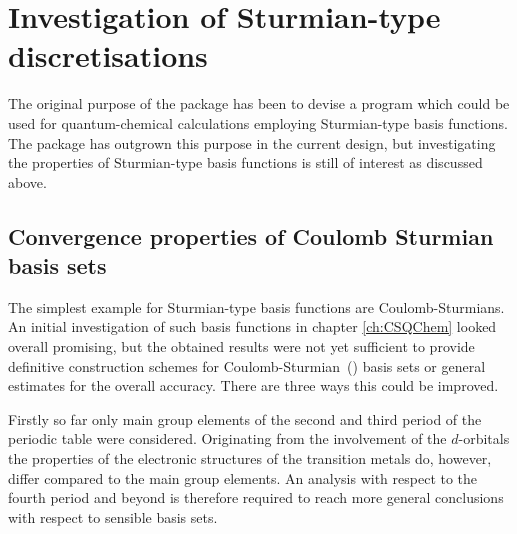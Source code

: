 
%
%
\section{Investigation of Sturmian-type discretisations}
\label{sec:newSturmian}
The original purpose of the \molsturm package has been to devise a program
which could be used for quantum-chemical calculations
employing Sturmian-type basis functions.
The package has outgrown this purpose in the current design,
but investigating the properties
of Sturmian-type basis functions is still of interest
as discussed above.

\subsection{Convergence properties of Coulomb Sturmian basis sets}
The simplest example for Sturmian-type basis functions are Coulomb-Sturmians.
An initial investigation of such basis functions
in chapter \ref{ch:CSQChem} looked overall promising,
but the obtained results were not yet sufficient to provide definitive
construction schemes for Coulomb-Sturmian~(\CS) basis sets
or general estimates for the overall accuracy.
There are three ways this could be improved.

Firstly so far only main group elements of the second and third
period of the periodic table were considered.
Originating from the involvement of the $d$-orbitals
the properties of the electronic structures of the transition metals do, however,
differ compared to the main group elements.
An analysis with respect to the fourth period and beyond
is therefore required to reach more general conclusions
with respect to sensible \CS basis sets.

